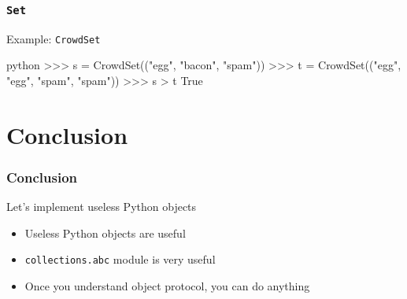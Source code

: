 \documentclass[aspectratio=169,dvipdfmx,12pt,notheorems]{beamer}
\theoremstyle{definition}
\begin{document}
\begin{frame}[fragile]\frametitle{\texttt{Set}}

\begin{exampleblock}{Example: \texttt{CrowdSet}}
\begin{pygments}{python}
>>> s = CrowdSet(("egg", "bacon", "spam"))
>>> t = CrowdSet(("egg", "egg", "spam", "spam"))
>>> s > t
True
\end{pygments}
\end{exampleblock}

\end{frame}

\section{Conclusion}

\begin{frame}\frametitle{Conclusion}

\begin{block}{Let's implement useless Python objects}
\begin{itemize}
\item Useless Python objects are useful
\item \texttt{collections.abc} module is very useful
\item Once you understand object protocol, you can do anything
\end{itemize}
\end{block}
\end{frame}
\end{document}
